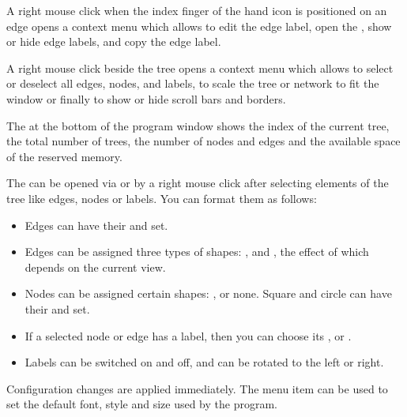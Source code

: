 \documentclass[11pt]{article}
\begin{document}
A right mouse click when the index finger of the hand icon is positioned on an edge opens a context menu which allows to
edit the edge label, open the , show or hide edge labels, and copy the edge label.

A right mouse click beside the tree opens a context menu which allows to select or deselect all edges, nodes, and labels, to scale the tree or network to fit the window or finally to show or hide scroll bars and borders.



The  at the bottom of the program window shows the index of the current tree,
the total number of trees, the number of nodes and edges and the available space of the reserved memory. 




The  can be opened via  or by a right mouse click 
after selecting elements of the tree like edges, nodes or labels.
You can format them as follows:

\begin{itemize}
\item Edges can have their  and    set.
\item Edges can be assigned three types of shapes: , 
and ,
the effect of which depends on the current view.
\item Nodes can be assigned certain shapes: ,  or none.
Square and circle  can have their  and  set.
\item 
If a selected node or edge has a label, then you can choose its , 
or .
\item Labels can be switched on and off, and can be rotated to the left or right. 
\end{itemize}

Configuration changes are applied immediately.
The  menu item
can be used to set the default font, style and size used by the program. 
\end{document}
